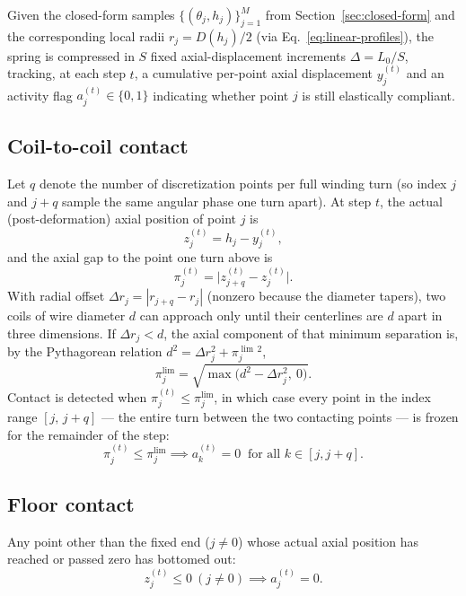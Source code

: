 \documentclass[11pt]{article}
\begin{document}
Given the closed-form samples $\{(\theta_j, h_j)\}_{j=1}^{M}$ from
Section~\ref{sec:closed-form} and the corresponding local radii
$r_j = D(h_j)/2$ (via Eq.~\eqref{eq:linear-profiles}), the spring is
compressed in $S$ fixed axial-displacement increments
$\Delta = L_0/S$, tracking, at each step $t$, a cumulative per-point
axial displacement $y_j^{(t)}$ and an activity flag $a_j^{(t)}\in\{0,1\}$
indicating whether point $j$ is still elastically compliant.

\subsection{Coil-to-coil contact}

Let $q$ denote the number of discretization points per full winding turn
(so index $j$ and $j+q$ sample the same angular phase one turn apart).
At step $t$, the actual (post-deformation) axial position of point $j$ is
\begin{equation}
z_j^{(t)} = h_j - y_j^{(t)} ,
\end{equation}
and the axial gap to the point one turn above is
\begin{equation}
\pi_j^{(t)} = \big|z_{j+q}^{(t)} - z_j^{(t)}\big| .
\label{eq:axial-gap}
\end{equation}
With radial offset $\Delta r_j = |r_{j+q} - r_j|$ (nonzero because the
diameter tapers), two coils of wire diameter $d$ can approach only until
their centerlines are $d$ apart in three dimensions. If $\Delta r_j < d$,
the axial component of that minimum separation is, by the Pythagorean
relation $d^2 = \Delta r_j^2 + \pi_j^{\lim\,2}$,
\begin{equation}
\pi_j^{\lim} = \sqrt{\max\!\big(d^2 - \Delta r_j^2,\ 0\big)} .
\label{eq:pz-limit}
\end{equation}
Contact is detected when $\pi_j^{(t)} \le \pi_j^{\lim}$, in which case
every point in the index range $[j,\,j+q]$ — the entire turn between the
two contacting points — is frozen for the remainder of the step:
\begin{equation}
\pi_j^{(t)} \le \pi_j^{\lim} \implies a_k^{(t)} = 0 \ \text{ for all } k\in[j,j+q].
\label{eq:contact-freeze}
\end{equation}

\subsection{Floor contact}

Any point other than the fixed end ($j\ne 0$) whose actual axial position
has reached or passed zero has bottomed out:
\begin{equation}
z_j^{(t)} \le 0 \ (j \ne 0) \implies a_j^{(t)} = 0 .
\label{eq:floor-contact}
\end{equation}
\end{document}
